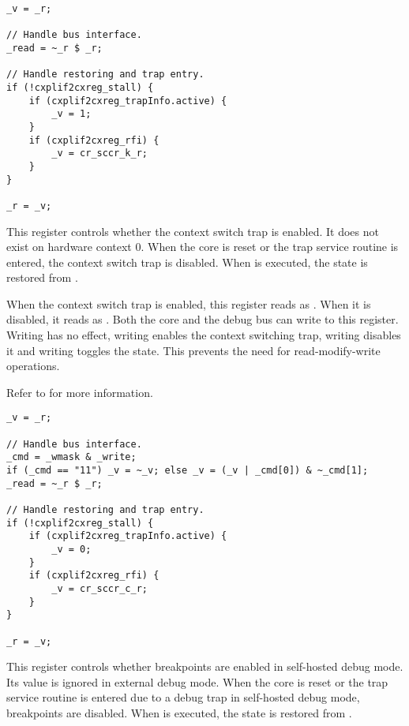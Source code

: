 \declaration{}
\implementation{}
\begin{lstlisting}
_v = _r;

// Handle bus interface.
_read = ~_r $ _r;

// Handle restoring and trap entry.
if (!cxplif2cxreg_stall) {
    if (cxplif2cxreg_trapInfo.active) {
        _v = 1;
    }
    if (cxplif2cxreg_rfi) {
        _v = cr_sccr_k_r;
    }
}

_r = _v;
\end{lstlisting}

This register controls whether the context switch trap is enabled. It does not 
exist on hardware context 0. When the core is reset or the trap service routine 
is entered, the context switch trap is disabled. When  is executed, 
the state is restored from .

When the context switch trap is enabled, this register reads as . When 
it is disabled, it reads as . Both the core and the debug bus can write 
to this register. Writing  has no effect, writing  enables the 
context switching trap, writing  disables it and writing  
toggles the state. This prevents the need for read-modify-write operations.

Refer to  for more information.

\declaration{}
\implementation{}
\begin{lstlisting}
_v = _r;

// Handle bus interface.
_cmd = _wmask & _write;
if (_cmd == "11") _v = ~_v; else _v = (_v | _cmd[0]) & ~_cmd[1];
_read = ~_r $ _r;

// Handle restoring and trap entry.
if (!cxplif2cxreg_stall) {
    if (cxplif2cxreg_trapInfo.active) {
        _v = 0;
    }
    if (cxplif2cxreg_rfi) {
        _v = cr_sccr_c_r;
    }
}

_r = _v;
\end{lstlisting}

This register controls whether breakpoints are enabled in self-hosted debug 
mode. Its value is ignored in external debug mode. When the core is reset or the 
trap service routine is entered due to a debug trap in self-hosted debug mode, 
breakpoints are disabled. When  is executed, the state is restored 
from .

